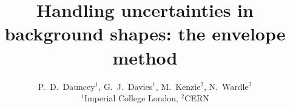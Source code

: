 \documentclass[11pt,a4paper]{article}
\begin{document}
\title{
\Large \bf Handling uncertainties in background shapes: the envelope method}
\author{P.~D.~Dauncey$^1$, G.~J.~Davies$^1$, M.~Kenzie$^2$, N.~Wardle$^2$\\
$^1$Imperial College London, $^2$CERN}

\maketitle

\tableofcontents
\newpage








\end{document}
